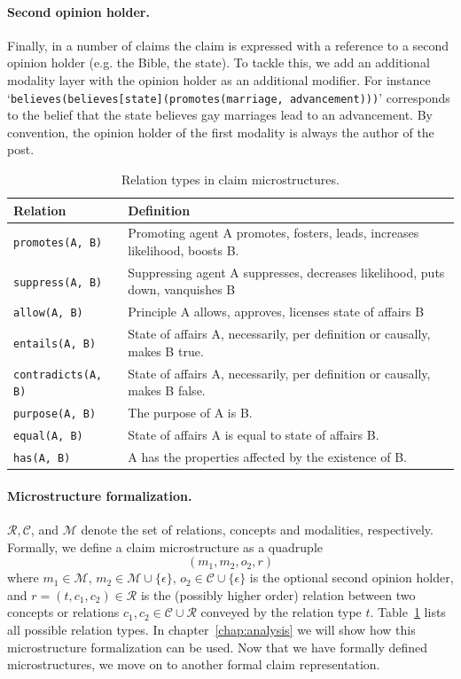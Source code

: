 \paragraph{Second opinion holder. }
Finally, in a number of claims the claim is expressed with a reference to a second
opinion holder (e.g. the Bible, the state). 
To tackle this, we add an additional modality layer with the opinion holder as
an additional modifier. 
For instance `\texttt{believes(believes[state](promotes(marriage, advancement)))}' corresponds
to the belief that the state believes gay marriages lead to an advancement. 
By convention, the opinion holder of the first modality is always the author of the post. 

\begin{table}
{\footnotesize
\begin{tabular}{lp{}}
\toprule
\textbf{Relation} & \textbf{Definition} \\
\midrule
\texttt{promotes(A, B)} & Promoting agent A promotes, fosters, leads, increases likelihood, boosts B.  \\
\texttt{suppress(A, B)} & Suppressing agent A suppresses, decreases likelihood, puts down, vanquishes B \\
\midrule
\texttt{allow(A, B)} & Principle A allows, approves, licenses state of affairs B \\
\midrule
\texttt{entails(A, B)} & State of affairs A, necessarily, per definition or causally, makes B true. \\
\texttt{contradicts(A, B)} & State of affairs A, necessarily, per definition or causally, makes B false. \\
\midrule
\texttt{purpose(A, B)} & The purpose of A is B. \\
\midrule
\texttt{equal(A, B)} & State of affairs A is equal to state of affairs B. \\
\midrule
\texttt{has(A, B)} & A has the properties affected by the existence of B.  \\
\bottomrule
\end{tabular}}
\caption{Relation types in claim microstructures.}
\label{tab:microstructures_relations}
\end{table}

\paragraph{Microstructure formalization. }$\mathcal{R}, \mathcal{C}$, and
$\mathcal{M}$ denote the set of relations, concepts and
modalities, respectively. 
Formally, we define a claim microstructure as a quadruple 
$$
(m_1, m_2, o_2, r)
$$ 
where $m_1 \in \mathcal{M}$, $m_2 \in \mathcal{M} \cup \{\epsilon\}$,
$o_2 \in \mathcal{C} \cup \{\epsilon\}$ is the optional second opinion holder, and 
$r = (t, c_1, c_2) \in \mathcal{R}$ is the (possibly higher order) relation 
between two concepts or relations $c_1, c_2 \in \mathcal{C} \cup \mathcal{R}$
conveyed by the relation type $t$.
Table~\ref{tab:microstructures_relations} lists all possible relation types. 
In chapter~\ref{chap:analysis} we will show
how this microstructure formalization can be used. 
Now that we have formally defined microstructures, we move on to another
formal claim representation. 


